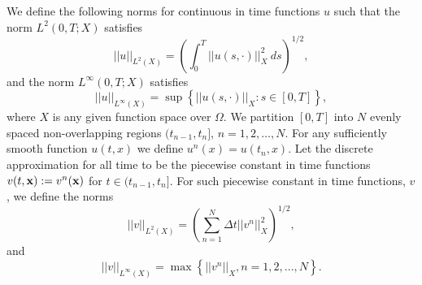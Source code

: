 We define the following norms for continuous in time functions $u$ such that the norm $L^2(0,T; X)$ satisfies
\begin{equation*}
 || u ||_{L^2( X) }= \left( \int_0^T || u (s,\cdot) ||^2_X ~ds \right)^{1/2},
\end{equation*}
and the norm $L^{\infty}(0,T; X)$ satisfies
\begin{equation*}
 || u ||_{L^{\infty}(X) }= \sup\left\lbrace ||{u (s,\cdot)}||_{X} : s \in [0,T] \right\rbrace,
\end{equation*}
where $X$ is any given function space over $\Omega$. We partition $[0,T]$ into $N$ evenly spaced non-overlapping regions $(t_{n-1}, t_n]$, $n=1,2,\dots, N$. For any sufficiently smooth function $u(t,x)$ we define $u^n(x) = u(t_n,x)$. Let the discrete approximation for all time to be the piecewise constant in time functions $v(t,{\bf x})  := v^n({\bf x})$ for $t \in (t_{n-1}, t_n]$. For such piecewise constant in time functions, $v$, we define the norms
\begin{equation*}
 || v ||_{L^2( X) }= \left( \sum_{n=1}^N \Delta t   || v^n||^2_X \right)^{1/2},
\end{equation*}
and
\begin{equation*}
 || v ||_{L^{\infty}( X) }= \max\left\lbrace ||{v^n}||_{X}, n=1,2,...,N \right\rbrace.
\end{equation*}




